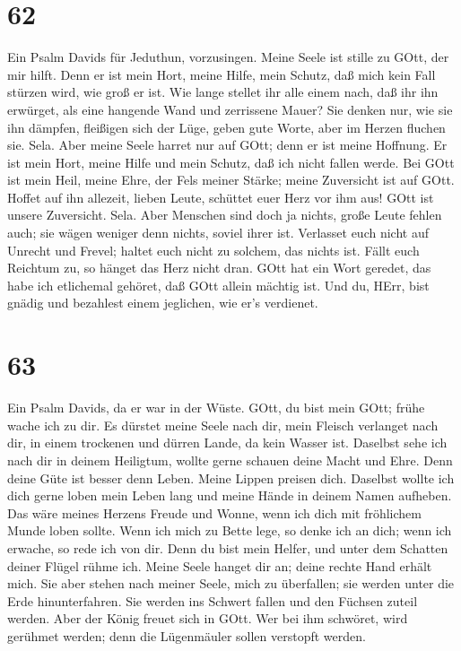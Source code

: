 \hypertarget{section-61}{%
\section{62}\label{section-61}}

 Ein Psalm Davids für Jeduthun, vorzusingen. 
Meine Seele ist stille zu GOtt, der mir hilft.  Denn er ist
mein Hort, meine Hilfe, mein Schutz, daß mich kein Fall stürzen wird,
wie groß er ist.  Wie lange stellet ihr alle einem nach, daß
ihr ihn erwürget, als eine hangende Wand und zerrissene Mauer?
 Sie denken nur, wie sie ihn dämpfen, fleißigen sich der
Lüge, geben gute Worte, aber im Herzen fluchen sie. Sela. 
Aber meine Seele harret nur auf GOtt; denn er ist meine Hoffnung.
 Er ist mein Hort, meine Hilfe und mein Schutz, daß ich
nicht fallen werde.  Bei GOtt ist mein Heil, meine Ehre, der
Fels meiner Stärke; meine Zuversicht ist auf GOtt.  Hoffet
auf ihn allezeit, lieben Leute, schüttet euer Herz vor ihm aus! GOtt ist
unsere Zuversicht. Sela.  Aber Menschen sind doch ja
nichts, große Leute fehlen auch; sie wägen weniger denn nichts, soviel
ihrer ist.  Verlasset euch nicht auf Unrecht und Frevel;
haltet euch nicht zu solchem, das nichts ist. Fällt euch Reichtum zu, so
hänget das Herz nicht dran.  GOtt hat ein Wort geredet, das
habe ich etlichemal gehöret, daß GOtt allein mächtig ist. 
Und du, HErr, bist gnädig und bezahlest einem jeglichen, wie er's
verdienet.

\hypertarget{section-62}{%
\section{63}\label{section-62}}

 Ein Psalm Davids, da er war in der Wüste. 
GOtt, du bist mein GOtt; frühe wache ich zu dir. Es dürstet meine Seele
nach dir, mein Fleisch verlanget nach dir, in einem trockenen und dürren
Lande, da kein Wasser ist.  Daselbst sehe ich nach dir in
deinem Heiligtum, wollte gerne schauen deine Macht und Ehre.
 Denn deine Güte ist besser denn Leben. Meine Lippen preisen
dich.  Daselbst wollte ich dich gerne loben mein Leben lang
und meine Hände in deinem Namen aufheben.  Das wäre meines
Herzens Freude und Wonne, wenn ich dich mit fröhlichem Munde loben
sollte.  Wenn ich mich zu Bette lege, so denke ich an dich;
wenn ich erwache, so rede ich von dir.  Denn du bist mein
Helfer, und unter dem Schatten deiner Flügel rühme ich. 
Meine Seele hanget dir an; deine rechte Hand erhält mich. 
Sie aber stehen nach meiner Seele, mich zu überfallen; sie werden unter
die Erde hinunterfahren.  Sie werden ins Schwert fallen und
den Füchsen zuteil werden.  Aber der König freuet sich in
GOtt. Wer bei ihm schwöret, wird gerühmet werden; denn die Lügenmäuler
sollen verstopft werden.

